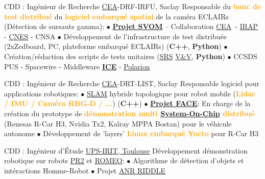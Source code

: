 \documentclass[
	a4paper,
	subsectioncolor=cvblue!70,
]{fortysecondscv}
\newcommand{\cea}{\href{http://www.cea.fr/}{CEA}}
\newcommand{\hl}[1]{\textbf{\textcolor{orange}{#1}}}
\begin{document}
\begin{cvtable}[2]
  {CDD : Ingénieur de Recherche}
  {\cea-DRF-IRFU, Saclay}
  {
    Responsable du \hl{banc de test distribué} du \hl{logiciel embarqué spatial} de la
    caméra ECLAIRs (Détection de sursauts gamma):\newline
    $\bullet$ \hl{\href{http://www.svom.fr/}{Projet SVOM}} -- Collaboration
    \cea\ - \href{http://www.irap.omp.eu/}{IRAP} -
    \href{https://cnes.fr/fr}{CNES} - CNSA\newline
    $\bullet$ Développement de l'infrastructure de test distribuée (2xZedboard, PC, plateforme embarqué ECLAIRs) (\textbf{C++},
    \textbf{Python})\newline
    $\bullet$ Création/rédaction des scripts de tests unitaires
    (\href{https://en.wikipedia.org/wiki/Software_requirements_specification}{SRS}
    \href{https://en.wikipedia.org/wiki/Software_verification_and_validation}{V\&V},
    \textbf{Python})\newline
    $\bullet$ CCSDS PUS - Spacewire - Middleware
    \href{https://zeroc.com/products/ice}{\textbf{ICE}} -
    \href{https://www.plm.automation.siemens.com/global/en/products/polarion/}{Polarion}
  }

  {CDD : Ingénieur de Recherche}
  {\cea-DRT-LIST, Saclay}
  {
    Responsable logiciel pour applications robotiques:\newline
    $\bullet$
    \href{https://en.wikipedia.org/wiki/Simultaneous_localization_and_mapping}{SLAM}
    hybride topologique pour robot mobile (\hl{Lidar / IMU / Caméra RBG-D / ...})
    (\textbf{C++})\newline
    $\bullet$ \textbf{\href{https://www.designspot.fr/portfolio/face/}{Projet
        FACE}}: En charge de la création du prototype de \hl{démonstration multi
    \href{https://en.wikipedia.org/wiki/System_on_a_chip}{System-On-Chip}
    distribué} (Renesas R-Car H3, Nvidia Tx2, Kalray MPPA Bostan) pour le
    véhicule autonome\newline
    $\bullet$ Développement de 'layers' \hl{Linux embarqué Yocto} pour R-Car H3
  }

  {CDD : Ingénieur d'Étude}
  {\href{https://www.irit.fr/?lang=fr}{UPS-IRIT, Toulouse}}
  {
    Développement démonstration robotique sur robots
    \href{http://www.willowgarage.com/pages/pr2/overview}{PR2} et
      \href{https://spectrum.ieee.org/automaton/robotics/humanoids/aldebaran-robotics-introduces-romeo-finally}{ROMEO}:\newline
    $\bullet$ Algorithme de détection d'objets et intéractions Homme-Robot\newline
    $\bullet$ Projet
    \href{http://www.agence-nationale-recherche.fr/Project-ANR-12-CORD-0003}{ANR
      RIDDLE}
  }
\end{cvtable}
\end{document}
